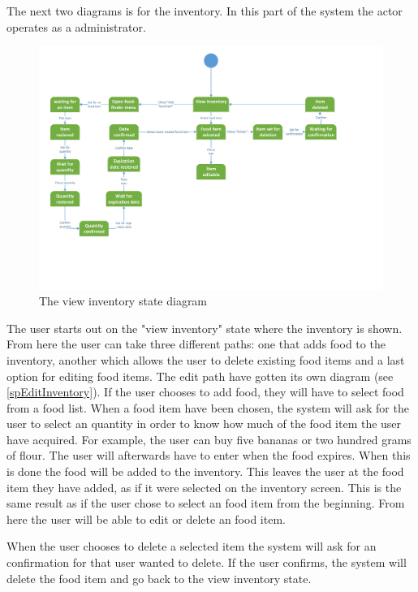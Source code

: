 The next two diagrams is for the inventory. In this part of the system the actor operates as a administrator.

\begin{figure}[H]
	\centering
	\includegraphics[width=1.0\textwidth]{ApplicationDomain/spViewInventory.pdf} 
	\caption{The view inventory state diagram}
	\label{Inventory_Figure}
\end{figure}
The user starts out on the "view inventory" state where the inventory is shown. From here the user can take three different paths: one that adds food to the inventory, another which allows the user to delete existing food items and a last option for editing food items. The edit path have gotten its own diagram (see \ref{spEditInventory}). If the user chooses to add food, they will have to select food from a food list. When a food item have been chosen, the system will ask for the user to select an quantity in order to know how much of the food item the user have acquired. For example, the user can buy five bananas or two hundred grams of flour. The user will afterwards have to enter when the food expires. When this is done the food will be added to the inventory. This leaves the user at the food item they have added, as if it were selected on the inventory screen. This is the same result as if the user chose to select an food item from the beginning. From here the user will be able to edit or delete an food item. 

When the user chooses to delete a selected item the system will ask for an confirmation for that user wanted to delete. If the user confirms, the system will delete the food item and go back to the view inventory state.


